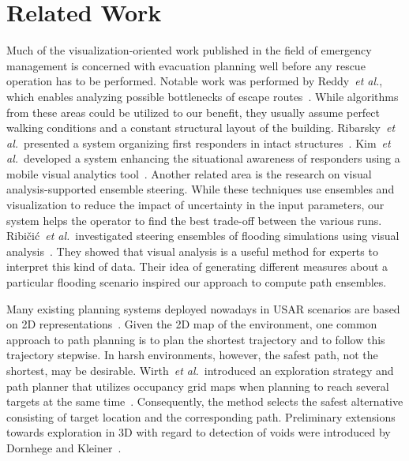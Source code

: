 \documentclass[review,journal]{vgtc}         %
\def\etal{\textit{et al.}}
\begin{document}

\section{Related Work} \label{sec:relatedwork}
 Much of the visualization-oriented work published in the field of emergency management is concerned with evacuation planning well before any rescue operation has to be performed. Notable work was performed by Reddy~\etal, which enables analyzing possible bottlenecks of escape routes~\cite{EuroVA12:13-17:2012}. While algorithms from these areas could be utilized to our benefit, they usually assume perfect walking conditions and a constant structural layout of the building. Ribarsky~\etal\ presented a system organizing first responders in intact structures~\cite{Ribarsky:2010}. Kim~\etal\ developed a system enhancing the situational awareness of responders using a mobile visual analytics tool~\cite{Kim:2008}. Another related area is the research on visual analysis-supported ensemble steering. While these techniques use ensembles and visualization to reduce the impact of uncertainty in the input parameters, our system helps the operator to find the best trade-off between the various runs. Ribi\v{c}i\'c~\etal\ investigated steering ensembles of flooding simulations using visual analysis~\cite{6280550}. They showed that visual analysis is a useful method for experts to interpret this kind of data. Their idea of generating different measures about a particular flooding scenario inspired our approach to compute path ensembles. 

Many existing planning systems deployed nowadays in USAR scenarios are based on 2D representations~\cite{kleiner_et_al_ssrr09,KohlbrecherMeyerStrykKlingaufFlexibleSlamSystem2011,Pellenz2009SMU}. Given the 2D map of the environment, one common approach to path planning is to plan the shortest trajectory and to follow this trajectory stepwise. In harsh environments, however, the safest path, not the shortest, may be desirable. Wirth~\etal\ introduced an exploration strategy and path planner that utilizes occupancy grid maps when planning to reach several targets at the same time~\cite{Wirth2007ETA1}. Consequently, the method selects the safest alternative consisting of target location and the corresponding path. Preliminary extensions towards exploration in 3D with regard to detection of voids were introduced by Dornhege and Kleiner~\cite{dornhege2011frontier}.
\end{document}
